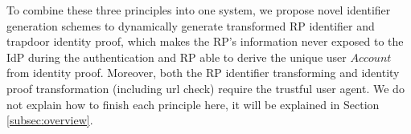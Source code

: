 To combine these three principles into one system, we propose novel identifier generation schemes to dynamically generate transformed RP identifier and trapdoor identity proof, which makes the RP's information never exposed to the IdP during the authentication and RP able to derive the unique user $Account$ from identity proof. Moreover, both the RP identifier transforming and identity proof transformation (including url check) require the trustful user agent. We do not explain how to finish each principle here, it will be explained in Section \ref{subsec:overview}.









